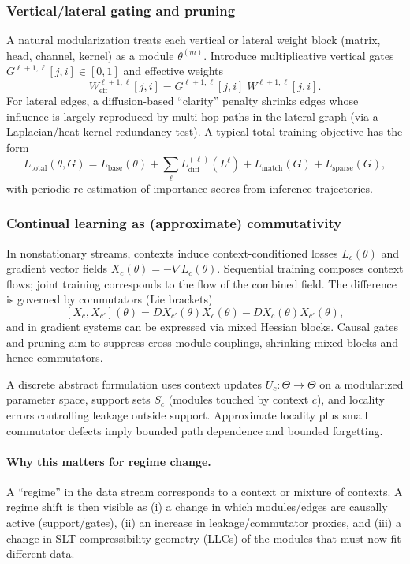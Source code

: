 \documentclass[11pt]{article}
\begin{document}
\subsubsection{Vertical/lateral gating and pruning}
A natural modularization treats each vertical or lateral weight block (matrix, head, channel, kernel)
as a module $\theta^{(m)}$.
Introduce multiplicative vertical gates $G^{\ell+1,\ell}[j,i] \in [0,1]$ and effective weights
\[
W^{\ell+1,\ell}_{\mathrm{eff}}[j,i] = G^{\ell+1,\ell}[j,i]\; W^{\ell+1,\ell}[j,i].
\]
For lateral edges, a diffusion-based ``clarity'' penalty shrinks edges whose influence is largely
reproduced by multi-hop paths in the lateral graph (via a Laplacian/heat-kernel redundancy test).
A typical total training objective has the form
\[
L_{\mathrm{total}}(\theta,G) = L_{\mathrm{base}}(\theta) + \sum_{\ell} L_{\mathrm{diff}}^{(\ell)}(L^\ell)
+ L_{\mathrm{match}}(G) + L_{\mathrm{sparse}}(G),
\]
with periodic re-estimation of importance scores from inference trajectories.

\subsubsection{Continual learning as (approximate) commutativity}
In nonstationary streams, contexts induce context-conditioned losses $L_c(\theta)$ and gradient vector fields
$X_c(\theta) = -\nabla L_c(\theta)$. Sequential training composes context flows; joint training corresponds to
the flow of the combined field. The difference is governed by commutators (Lie brackets)
\[
[X_c,X_{c'}](\theta) = D X_{c'}(\theta) X_c(\theta) - D X_c(\theta) X_{c'}(\theta),
\]
and in gradient systems can be expressed via mixed Hessian blocks. Causal gates and pruning aim to suppress
cross-module couplings, shrinking mixed blocks and hence commutators.

A discrete abstract formulation uses context updates $U_c:\Theta \to \Theta$ on a modularized parameter space,
support sets $S_c$ (modules touched by context $c$), and locality errors controlling leakage outside support.
Approximate locality plus small commutator defects imply bounded path dependence and bounded forgetting.

\paragraph{Why this matters for regime change.}
A ``regime'' in the data stream corresponds to a context or mixture of contexts.
A regime shift is then visible as (i) a change in which modules/edges are causally active (support/gates),
(ii) an increase in leakage/commutator proxies, and (iii) a change in SLT compressibility geometry (LLCs)
of the modules that must now fit different data.
\end{document}
